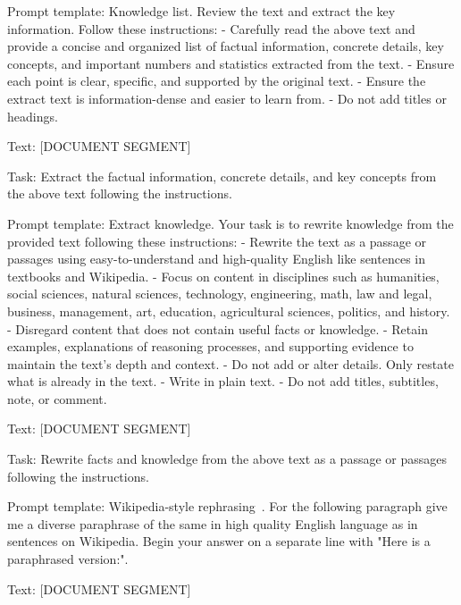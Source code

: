 \documentclass[11pt]{article}
\begin{document}
\begin{table}[!hbt]
\begin{prompt}{Prompt template: Knowledge list.}
Review the text and extract the key information. Follow these instructions:
- Carefully read the above text and provide a concise and organized list of factual information, concrete details, key concepts, and important numbers and statistics extracted from the text.
- Ensure each point is clear, specific, and supported by the original text.
- Ensure the extract text is information-dense and easier to learn from.
- Do not add titles or headings.

Text:
[DOCUMENT SEGMENT]

Task:
Extract the factual information, concrete details, and key concepts from the above text following the instructions.
\end{prompt}

\end{table}

\begin{table}[!hbt]
\begin{prompt}{Prompt template: Extract knowledge.}
Your task is to rewrite knowledge from the provided text following these instructions:
- Rewrite the text as a passage or passages using easy-to-understand and high-quality English like sentences in textbooks and Wikipedia.
- Focus on content in disciplines such as humanities, social sciences, natural sciences, technology, engineering, math, law and legal, business, management, art, education, agricultural sciences, politics, and history.
- Disregard content that does not contain useful facts or knowledge.
- Retain examples, explanations of reasoning processes, and supporting evidence to maintain the text's depth and context.
- Do not add or alter details. Only restate what is already in the text.
- Write in plain text.
- Do not add titles, subtitles, note, or comment.

Text:
[DOCUMENT SEGMENT]

Task:
Rewrite facts and knowledge from the above text as a passage or passages following the instructions.
\end{prompt}
\end{table}

\begin{table}[!hbt]
\begin{prompt}{Prompt template: Wikipedia-style rephrasing~\citep{maini2024rephrasing}.}
For the following paragraph give me a diverse paraphrase of the same in high quality English language as in sentences on Wikipedia. Begin your answer on a separate line with "Here is a paraphrased version:".

Text: [DOCUMENT SEGMENT]
\end{prompt}
\end{table}
\end{document}
